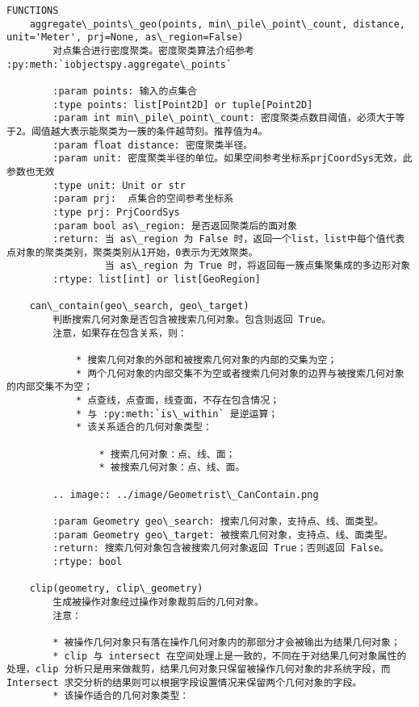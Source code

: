 \documentclass[11pt]{article}
\begin{document}
\begin{Verbatim}[commandchars=\\\{\}]
FUNCTIONS
    aggregate\_points\_geo(points, min\_pile\_point\_count, distance, unit='Meter', prj=None, as\_region=False)
        对点集合进行密度聚类。密度聚类算法介绍参考 :py:meth:`iobjectspy.aggregate\_points`
        
        :param points: 输入的点集合
        :type points: list[Point2D] or tuple[Point2D]
        :param int min\_pile\_point\_count: 密度聚类点数目阈值，必须大于等于2。阈值越大表示能聚类为一簇的条件越苛刻。推荐值为4。
        :param float distance: 密度聚类半径。
        :param unit: 密度聚类半径的单位。如果空间参考坐标系prjCoordSys无效，此参数也无效
        :type unit: Unit or str
        :param prj:  点集合的空间参考坐标系
        :type prj: PrjCoordSys
        :param bool as\_region: 是否返回聚类后的面对象
        :return: 当 as\_region 为 False 时，返回一个list，list中每个值代表点对象的聚类类别，聚类类别从1开始，0表示为无效聚类。
                 当 as\_region 为 True 时，将返回每一簇点集聚集成的多边形对象
        :rtype: list[int] or list[GeoRegion]
    
    can\_contain(geo\_search, geo\_target)
        判断搜索几何对象是否包含被搜索几何对象。包含则返回 True。
        注意，如果存在包含关系，则：
        
            * 搜索几何对象的外部和被搜索几何对象的内部的交集为空；
            * 两个几何对象的内部交集不为空或者搜索几何对象的边界与被搜索几何对象的内部交集不为空；
            * 点查线，点查面，线查面，不存在包含情况；
            * 与 :py:meth:`is\_within` 是逆运算；
            * 该关系适合的几何对象类型：
        
                * 搜索几何对象：点、线、面；
                * 被搜索几何对象：点、线、面。
        
        .. image:: ../image/Geometrist\_CanContain.png
        
        :param Geometry geo\_search: 搜索几何对象，支持点、线、面类型。
        :param Geometry geo\_target: 被搜索几何对象，支持点、线、面类型。
        :return: 搜索几何对象包含被搜索几何对象返回 True；否则返回 False。
        :rtype: bool
    
    clip(geometry, clip\_geometry)
        生成被操作对象经过操作对象裁剪后的几何对象。
        注意：
        
        * 被操作几何对象只有落在操作几何对象内的那部分才会被输出为结果几何对象；
        * clip 与 intersect 在空间处理上是一致的，不同在于对结果几何对象属性的处理，clip 分析只是用来做裁剪，结果几何对象只保留被操作几何对象的非系统字段，而 Intersect 求交分析的结果则可以根据字段设置情况来保留两个几何对象的字段。
        * 该操作适合的几何对象类型：
        

\end{Verbatim}
\end{document}
